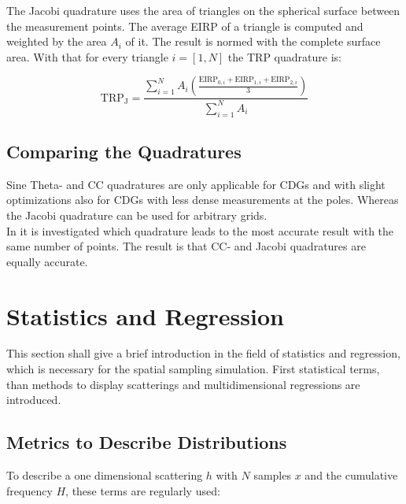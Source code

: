 The Jacobi quadrature uses the area of triangles on the spherical surface between the measurement points. The average \ac{EIRP} of a triangle is computed and weighted by the area $A_i$ of it. The result is normed with the complete surface area. With that for every triangle $i=\left[1,N\right]$ the \ac{TRP} quadrature is: \cite{trp}

\begin{equation}
\text{TRP}_{\text{J}} = \frac{\sum^N_{i=1}A_i\left(\frac{\text{EIRP}_{0,i}+\text{EIRP}_{1,i}+\text{EIRP}_{2,i}}{3}\right)}{\sum^N_{i=1}A_i}
\end{equation}

\subsection{Comparing the Quadratures}

Sine Theta- and \ac{CC} quadratures are only applicable for \acp{CDG} and with slight optimizations also for \acp{CDG} with less dense measurements at the poles. Whereas the Jacobi quadrature can be used for arbitrary grids.\\
In \cite{trp2} it is investigated which quadrature leads to the most accurate result with the same number of points. The result is that \ac{CC}- and Jacobi quadratures are equally accurate.

\section{Statistics and Regression}

This section shall give a brief introduction in the field of statistics and regression, which is necessary for the spatial sampling simulation. First statistical terms, than methods to display scatterings and multidimensional regressions are introduced.

\subsection{Metrics to Describe Distributions}

To describe a one dimensional scattering $h$ with $N$ samples $x$ and the cumulative frequency $H$, these terms are regularly used: \cite{dffs}

